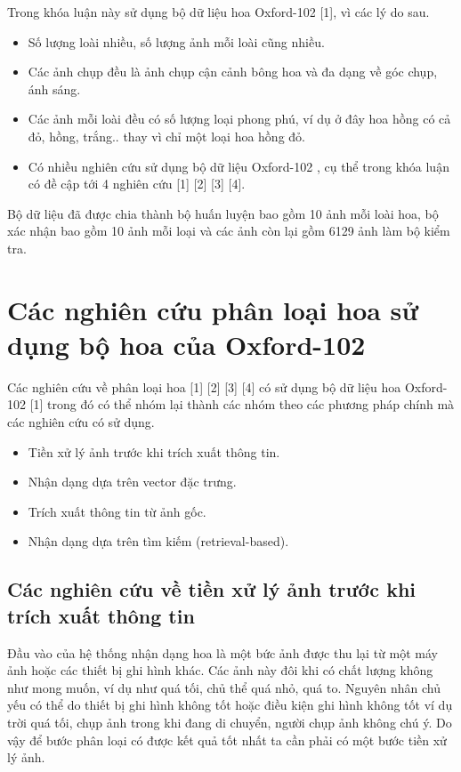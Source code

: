 \documentclass[12pt]{report}
\begin{document}
		Trong khóa luận này sử dụng bộ dữ liệu hoa Oxford-102 [1], vì các lý do sau.
																																																
		\begin{itemize}
			\item Số lượng loài nhiều, số lượng ảnh mỗi loài cũng nhiều.
			\item Các ảnh chụp đều là ảnh chụp cận cảnh bông hoa và đa dạng về góc chụp, ánh sáng.
			\item Các ảnh mỗi loài đều có số lượng loại phong phú, ví dụ ở đây hoa hồng có cả đỏ, hồng, trắng.. thay vì chỉ một loại hoa hồng đỏ.
			\item Có nhiều nghiên cứu sử dụng bộ dữ liệu Oxford-102 \cite{cia-Nilsback06}, cụ thể trong khóa luận có đề cập tới 4 nghiên cứu [1] [2] [3] [4].
		\end{itemize}				
																																																				
		Bộ dữ liệu đã được chia thành bộ huấn luyện bao gồm 10 ảnh mỗi loài hoa, bộ xác nhận bao gồm 10 ảnh mỗi loại và các ảnh còn lại gồm 6129 ảnh làm bộ kiểm tra. 	
																																																		
		\section{Các nghiên cứu phân loại hoa sử dụng bộ hoa của Oxford-102}
		Các nghiên cứu về phân loại hoa [1] [2] [3] [4] có sử dụng bộ dữ liệu hoa Oxford-102 [1] trong đó có thể nhóm lại thành các nhóm theo các phương pháp chính mà các nghiên cứu có sử dụng.
																																														
		\begin{itemize}
			\item Tiền xử lý ảnh trước khi trích xuất thông tin.
			\item Nhận dạng dựa trên vector đặc trưng.
			\item Trích xuất thông tin từ ảnh gốc.
			\item Nhận dạng dựa trên tìm kiếm (retrieval-based).
		\end{itemize}
																																														
		\subsection{Các nghiên cứu về tiền xử lý ảnh trước khi trích xuất thông tin}
		Đầu vào của hệ thống nhận dạng hoa là một bức ảnh được thu lại từ một máy ảnh hoặc các thiết bị ghi hình khác. Các ảnh này đôi khi có chất lượng không như mong muốn, ví dụ như quá tối, chủ thể quá nhỏ, quá to. Nguyên nhân chủ yếu có thể do thiết bị ghi hình không tốt hoặc điều kiện ghi hình không tốt ví dụ trời quá tối, chụp ảnh trong khi đang di chuyển, người chụp ảnh không chú ý. Do vậy để bước phân loại có được kết quả tốt nhất ta cần phải có một bước tiền xử lý ảnh. 
																																												
\end{document}
